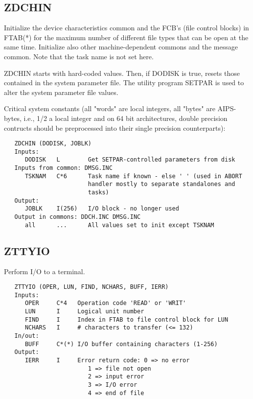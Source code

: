 \subsection{ZDCHIN}
Initialize the device characteristics common and the FCB's (file
control blocks) in FTAB(*) for the maximum number of different file
types that can be open at the same time.  Initialize also other
machine-dependent commons and the message common.  Note that the
task name is not set here.

ZDCHIN starts with hard-coded values.  Then, if DODISK is true,
resets those contained in the system parameter file.  The utility
program SETPAR is used to alter the system parameter file values.

Critical system constants (all "words" are local integers, all
"bytes" are AIPS-bytes, i.e., 1/2 a local integer and on 64 bit
architectures, double precision contructs should be preprocessed
into their single precision counterparts):
\begin{verbatim}
   ZDCHIN (DODISK, JOBLK)
   Inputs:
      DODISK   L        Get SETPAR-controlled parameters from disk
   Inputs from common: DMSG.INC
      TSKNAM   C*6      Task name if known - else ' ' (used in ABORT
                        handler mostly to separate standalones and
                        tasks)
   Output:
      JOBLK    I(256)   I/O block - no longer used
   Output in commons: DDCH.INC DMSG.INC
      all      ...      All values set to init except TSKNAM

\end{verbatim}

\subsection{ZTTYIO}
Perform I/O to a terminal.
\begin{verbatim}
   ZTTYIO (OPER, LUN, FIND, NCHARS, BUFF, IERR)
   Inputs:
      OPER     C*4   Operation code 'READ' or 'WRIT'
      LUN      I     Logical unit number
      FIND     I     Index in FTAB to file control block for LUN
      NCHARS   I     # characters to transfer (<= 132)
   In/out:
      BUFF     C*(*) I/O buffer containing characters (1-256)
   Output:
      IERR     I     Error return code: 0 => no error
                        1 => file not open
                        2 => input error
                        3 => I/O error
                        4 => end of file
\end{verbatim}
